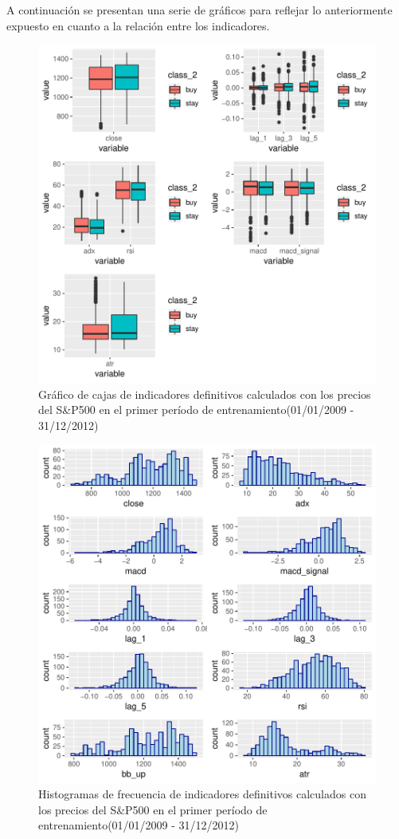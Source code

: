 \documentclass[a4paper,12pt]{Latex/Classes/PhDthesisPSnPDF}
\begin{document}
A continuación se presentan una serie de gráficos para reflejar lo anteriormente expuesto en cuanto a la relación entre los indicadores.


\begin{figure}[H]
\centering
\includegraphics{main-009}
\caption{Gráfico de cajas de indicadores definitivos calculados con los precios del S\&P500 en el primer período de entrenamiento(01/01/2009 - 31/12/2012)}
\end{figure}

\begin{figure}[H]
\centering
\includegraphics{main-010}
\caption{Histogramas de frecuencia de indicadores definitivos calculados con los precios del S\&P500 en el primer período de entrenamiento(01/01/2009 - 31/12/2012)}
\end{figure}
\end{document}
